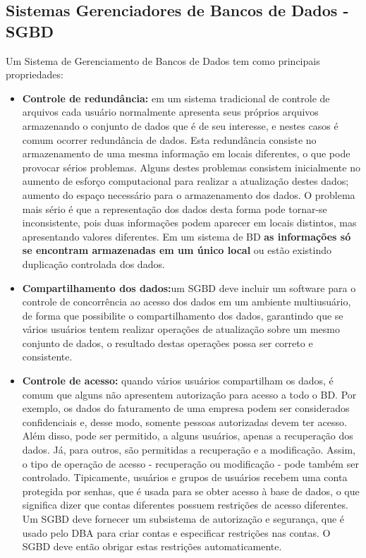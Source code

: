 \documentclass{article}
\begin{document}
\subsection{Sistemas Gerenciadores de Bancos de Dados - SGBD}
Um Sistema de Gerenciamento de Bancos de Dados tem como principais propriedades:
\begin{itemize}
    \item \textbf{Controle de redundância:} em um sistema tradicional de controle de arquivos cada usuário normalmente apresenta seus próprios arquivos armazenando o conjunto de dados que é de seu interesse, e nestes casos é comum ocorrer redundância de dados. Esta redundância consiste no armazenamento de uma mesma informação em locais diferentes, o que pode provocar sérios problemas. Alguns destes problemas consistem inicialmente no aumento de esforço computacional para realizar a atualização destes dados; aumento do espaço necessário para o armazenamento dos dados. O problema mais sério é que a representação dos dados desta forma pode tornar-se inconsistente, pois duas informações podem aparecer em locais distintos, mas apresentando valores diferentes. Em um sistema de BD \textbf{as informações só se encontram armazenadas em um único local} ou estão existindo duplicação controlada dos dados.
    \item \textbf{Compartilhamento dos dados:}um SGBD deve incluir um software para o controle de concorrência ao acesso dos dados em um ambiente multiusuário, de forma que possibilite o compartilhamento dos dados, garantindo que se vários usuários tentem realizar operações de atualização sobre um mesmo conjunto de dados, o resultado destas operações possa ser correto e consistente.
    \item \textbf{Controle de acesso:} quando vários usuários compartilham os dados, é comum que alguns não apresentem autorização para acesso a todo o BD. Por exemplo, os dados do faturamento de uma empresa podem ser considerados confidenciais e, desse modo, somente pessoas autorizadas devem ter acesso. Além disso, pode ser permitido, a alguns usuários, apenas a recuperação dos dados. Já, para outros, são permitidas a recuperação e a modificação. Assim, o tipo de operação de acesso - recuperação ou modificação - pode também ser controlado. Tipicamente, usuários e grupos de usuários recebem uma conta protegida por senhas, que é usada para se obter acesso à base de dados, o que significa dizer que contas diferentes possuem restrições de acesso diferentes. Um SGBD deve fornecer um subsistema de autorização e segurança, que é usado pelo DBA para criar contas e especificar restrições nas contas. O SGBD deve então obrigar estas restrições automaticamente.

\end{itemize}
\end{document}
